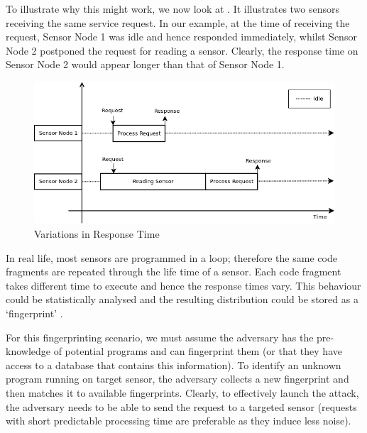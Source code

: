\documentclass{article}
\begin{document}



To illustrate why this might work, we now look at . It illustrates two sensors receiving the same service request. In our example, at the time of receiving the request, Sensor Node 1 was idle and hence responded immediately, whilst Sensor Node 2 postponed the request for reading a sensor. Clearly, the response time on Sensor Node 2 would appear longer than that of Sensor Node 1.

\begin{figure}
	\center
	\includegraphics[width=\textwidth]{fig/PingProbe_Theory.png}
	\caption{Variations in Response Time\label{FingerprintTheory}}
\end{figure}

In real life, most sensors are programmed in a loop; therefore the same code fragments are repeated through the life time of a sensor. Each code fragment takes different time to execute and hence the response times vary. This behaviour could be statistically analysed and the resulting distribution could be stored as a `fingerprint' .


For this fingerprinting scenario, we must assume the adversary has the pre-knowledge of potential programs and can fingerprint them (or that they have access to a database that contains this information). To identify an unknown program running on target sensor, the adversary collects a new fingerprint and then matches it to available fingerprints. Clearly, to effectively launch the attack, the adversary needs to be able to send the request to a targeted sensor (requests with short predictable processing time are preferable as they induce less noise). 
\end{document}
